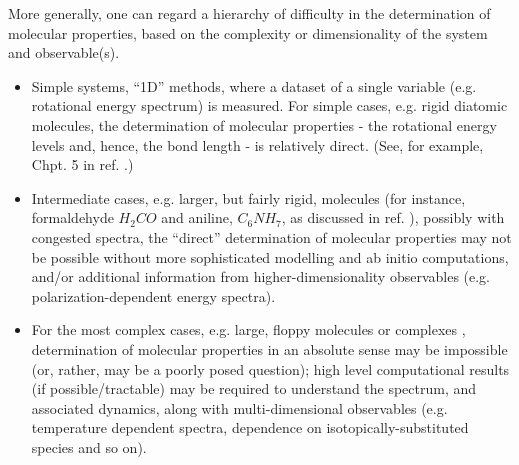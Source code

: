 
More generally, one can regard a hierarchy of difficulty in the determination of molecular properties, based on the complexity or dimensionality of the system and observable(s).
\begin{itemize}
\item Simple systems, ``1D” methods, where a dataset of a single variable (e.g. rotational energy spectrum) is measured. For simple cases, e.g. rigid diatomic molecules, the determination of molecular properties - the rotational energy levels and, hence, the bond length - is relatively direct. (See, for example, Chpt. 5 in ref. \cite{hollasHighRes}.) %
\item Intermediate cases, e.g. larger, but fairly rigid, molecules (for instance, formaldehyde $H_2CO$ and aniline, $C_6NH_7$, as discussed in ref. \cite{hollasHighRes}), possibly with congested spectra, the ``direct” determination of molecular properties may not be possible without more sophisticated modelling and ab initio computations, and/or additional information from higher-dimensionality observables (e.g. polarization-dependent energy spectra).
\item For the most complex cases, e.g. large, floppy molecules or complexes \cite{bunkerMolSymm,schmiedt2015SymmetryExtremelyFloppy}, determination of molecular properties in an absolute sense may be impossible (or, rather, may be a poorly posed question); high level computational results (if possible/tractable) may be required to understand the spectrum, and associated dynamics, along with multi-dimensional observables (e.g. temperature dependent spectra, dependence on isotopically-substituted species and so on).
\end{itemize}    

